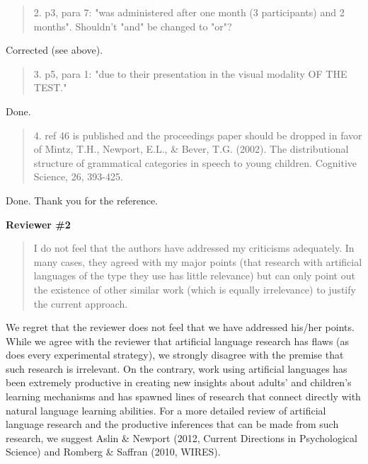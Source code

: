 \documentclass[12pt]{letter}
\begin{document}
\begin{quote}
2. p3, para 7: "was administered after one month (3 participants) and 2 months". Shouldn't "and" be changed to "or"?
\end{quote}

Corrected (see above). 

\begin{quote}
3. p5, para 1: "due to their presentation in the visual modality OF THE TEST."
\end{quote}

Done. 

\begin{quote}
4. ref 46 is published and the proceedings paper should be dropped in favor of Mintz, T.H., Newport, E.L., \& Bever, T.G. (2002). The distributional structure of grammatical categories in speech to young children. Cognitive Science, 26, 393-425.
\end{quote}

Done. Thank you for the reference.

{\bf Reviewer \#2}

\begin{quote}
I do not feel that the authors have addressed my criticisms adequately. In many cases, they agreed with my major points (that research with artificial languages of the type they use has little relevance) but can only point out the existence of other similar work (which is equally irrelevance) to justify the current approach. 
\end{quote}

We regret that the reviewer does not feel that we have addressed his/her points. While we agree with the reviewer that artificial language research has flaws (as does every experimental strategy), we strongly disagree with the premise that such research is irrelevant. On the contrary, work using artificial languages has been extremely productive in creating new insights about adults' and children's learning mechanisms and has spawned lines of research that connect directly with natural language learning abilities. For a more detailed review of artificial language research and the productive inferences that can be made from such research, we suggest Aslin \& Newport (2012, Current Directions in Psychological Science) and Romberg \& Saffran (2010, WIRES).
\end{document}
